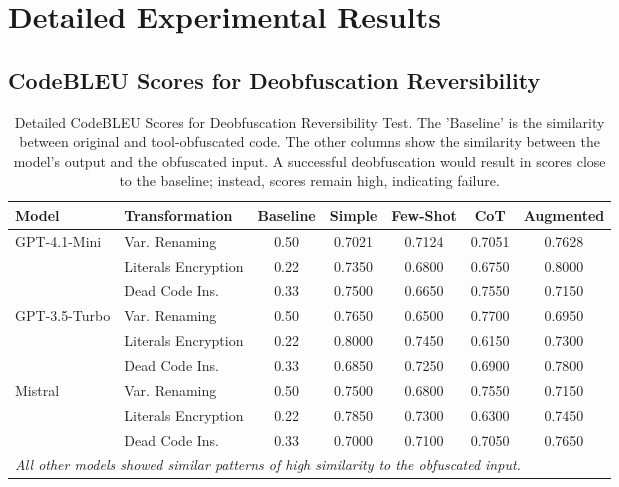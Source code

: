 \section{Detailed Experimental Results}
\label{appendix:results}

\subsection{CodeBLEU Scores for Deobfuscation Reversibility}

\begin{table}[htbp]
\centering
\caption{Detailed CodeBLEU Scores for Deobfuscation Reversibility Test. The 'Baseline' is the similarity between original and tool-obfuscated code. The other columns show the similarity between the model's output and the obfuscated input. A successful deobfuscation would result in scores close to the baseline; instead, scores remain high, indicating failure.}
\label{tab:reversibility_heatmap_data}
\begin{tabular}{llccccc}
\toprule
\textbf{Model} & \textbf{Transformation} & \textbf{Baseline} & \textbf{Simple} & \textbf{Few-Shot} & \textbf{CoT} & \textbf{Augmented} \\
\midrule
GPT-4.1-Mini & Var. Renaming    & 0.50 & 0.7021 & 0.7124 & 0.7051 & 0.7628 \\
             & Literals Encryption & 0.22 & 0.7350 & 0.6800 & 0.6750 & 0.8000 \\
             & Dead Code Ins.   & 0.33 & 0.7500 & 0.6650 & 0.7550 & 0.7150 \\
\midrule
GPT-3.5-Turbo & Var. Renaming   & 0.50 & 0.7650 & 0.6500 & 0.7700 & 0.6950 \\
              & Literals Encryption & 0.22 & 0.8000 & 0.7450 & 0.6150 & 0.7300 \\
              & Dead Code Ins.  & 0.33 & 0.6850 & 0.7250 & 0.6900 & 0.7800 \\
\midrule
Mistral       & Var. Renaming   & 0.50 & 0.7500 & 0.6800 & 0.7550 & 0.7150 \\
              & Literals Encryption & 0.22 & 0.7850 & 0.7300 & 0.6300 & 0.7450 \\
              & Dead Code Ins.  & 0.33 & 0.7000 & 0.7100 & 0.7050 & 0.7650 \\
\midrule
\multicolumn{7}{l}{\textit{All other models showed similar patterns of high similarity to the obfuscated input.}} \\
\bottomrule
\end{tabular}
\end{table}

